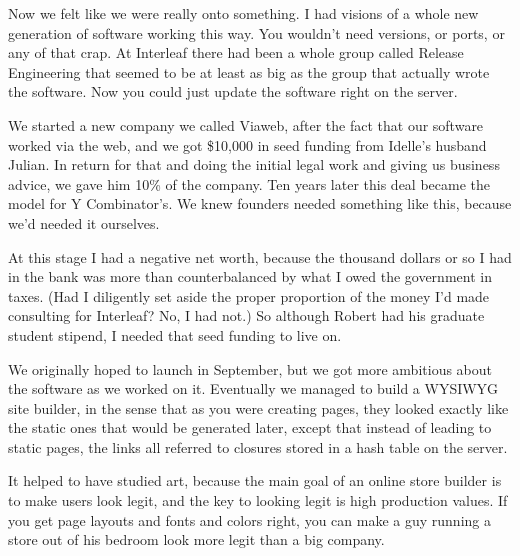 Now we felt like we were really onto
                  something. I had visions of a whole new generation of software
                  working this way. You wouldn't need versions, or ports, or any
                  of that crap. At Interleaf there had been a whole group called
                  Release Engineering that seemed to be at least as big as the
                  group that actually wrote the software. Now you could just
                  update the software right on the server.

We started
                  a new company we called Viaweb, after the fact that our
                  software worked via the web, and we got \$10,000 in seed
                  funding from Idelle's husband Julian. In return for that and
                  doing the initial legal work and giving us business advice, we
                  gave him 10\% of the company. Ten years later this deal became
                  the model for Y Combinator's. We knew founders needed
                  something like this, because we'd needed it ourselves.

At
                  this stage I had a negative net worth, because the thousand
                  dollars or so I had in the bank was more than counterbalanced
                  by what I owed the government in taxes. (Had I diligently set
                  aside the proper proportion of the money I'd made consulting
                  for Interleaf? No, I had not.) So although Robert had his
                  graduate student stipend, I needed that seed funding to live
                  on.

We originally hoped to launch in September, but
                  we got more ambitious about the software as we worked on it.
                  Eventually we managed to build a WYSIWYG site builder, in the
                  sense that as you were creating pages, they looked exactly
                  like the static ones that would be generated later, except
                  that instead of leading to static pages, the links all
                  referred to closures stored in a hash table on the server.

It
                  helped to have studied art, because the main goal of an online
                  store builder is to make users look legit, and the key to
                  looking legit is high production values. If you get page
                  layouts and fonts and colors right, you can make a guy running
                  a store out of his bedroom look more legit than a big
                  company.

